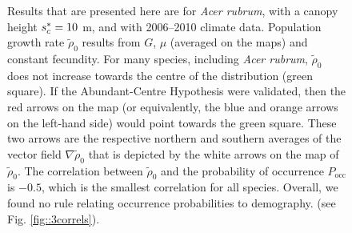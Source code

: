 \begin{figure}
	\caption{Results that are presented here are for \textit{Acer rubrum}, with a canopy height $ {s}^{*}_c = 10 $ m, and with 2006--2010 climate data. Population growth rate $ \tilde \rho_0 $ results from $ G $, $ \mu $ (averaged on the maps) and constant fecundity. For many species, including \textit{Acer rubrum}, $ \tilde \rho_0 $ does not increase towards the centre of the distribution (green square). If the Abundant-Centre Hypothesis were validated, then the red arrows on the map (or equivalently, the blue and orange arrows on the left-hand side) would point towards the green square. These two arrows are the respective northern and southern averages of the vector field $ \nabla \tilde \rho_0 $ that is depicted by the white arrows on the map of $ \tilde \rho_0 $. The correlation between $ \tilde \rho_0 $ and the probability of occurrence $ P_{\text{occ}}$ is $ -0.5 $, which is the smallest correlation for all species. Overall, we found no rule relating occurrence probabilities to demography. (see Fig. \ref{fig::3correls}). \label{fig::mainResults}}
\end{figure}

